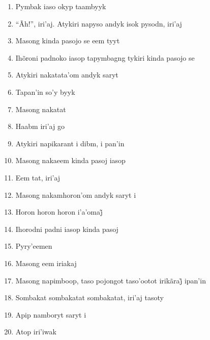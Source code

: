 \begin{enumerate}
 \item Pymbak iaso okyp taambyyk

 \item ``Ãh!'', iri'aj. Atykiri napyso andyk isok pysodn, iri'aj

 \item Masong kinda pasojo se eem tyyt

 \item Ihõroni padnoko iasop tapymbagng tykiri kinda pasojo se

 \item Atykiri nakatata'om andyk saryt

 \item Tapan'in so'y byyk

 \item Masong nakatat

 \begin{center}\end{center}

 \item Haabm iri'aj go

 \item Atykiri napikarant i dibm, i pan'in

 \item Masong nakaeem kinda pasoj iasop

 \item Eem tat, iri'aj

 \item Masong nakamhoron'om andyk saryt i

 \item Horon horon horon i’a’omaj̃

 \item Ihorodni padni iasop kinda pasoj

 \item Pyry'eemen

 \item Masong eem iriakaj

 \begin{center}\end{center}

 \item Masong napimboop, taso pojongot taso’ootot irikãraj̃ ipan’in

 \item Sombakat sombakatat sombakatat, iri'aj tasoty

 \item Apip namboryt saryt i

 \item Atop iri'iwak


\end{enumerate}
